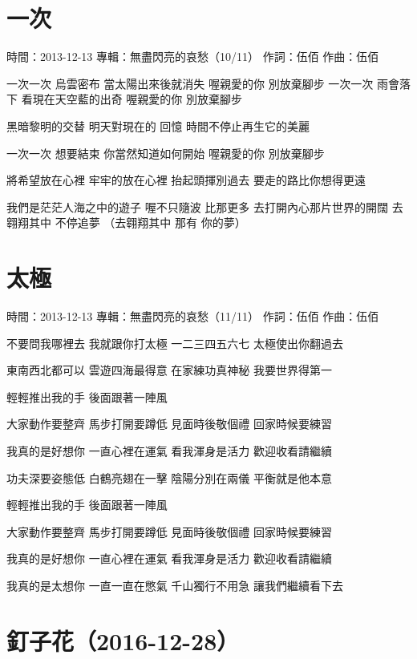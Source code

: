 \documentclass[UTF8,a4paper,oneside,twocolumn,12pt]{ctexbook}
\newcommand{\infopair}[2]{\textbullet #1：#2}
\newcommand{\zc}[1][伍佰]{\infopair{作詞}{#1}}
\newcommand{\zq}[1][伍佰]{\infopair{作曲}{#1}}
\newcommand{\zj}[1]{\infopair{專輯}{#1}}
\newcommand{\sj}[1]{\infopair{時間}{#1}}
\newenvironment{info}{\begin{flushleft}\kaishu
	}
	{\end{flushleft}\normalsize\yahei\par}
\newenvironment{lyric}{
	}
{}
\begin{document}
\section{一次}
\begin{info}
	\sj{2013-12-13}
	\zj{無盡閃亮的哀愁（10/11）}
	\zc
	\zq
\end{info}
\begin{lyric}
	一次一次 烏雲密布 當太陽出來後就消失
	喔親愛的你 別放棄腳步
	一次一次 雨會落下 看現在天空藍的出奇
	喔親愛的你 別放棄腳步

	黑暗黎明的交替 明天對現在的 回憶
	時間不停止再生它的美麗

	一次一次 想要結束 你當然知道如何開始
	喔親愛的你 別放棄腳步

	將希望放在心裡 牢牢的放在心裡
	抬起頭揮別過去 要走的路比你想得更遠

	我們是茫茫人海之中的遊子
	喔不只隨波 比那更多
	去打開內心那片世界的開闊
	去翱翔其中 不停追夢
	（去翱翔其中 那有 你的夢）
\end{lyric}

\section{太極}
\begin{info}
	\sj{2013-12-13}
	\zj{無盡閃亮的哀愁（11/11）}
	\zc
	\zq
\end{info}
\begin{lyric}
	不要問我哪裡去 我就跟你打太極
	一二三四五六七 太極使出你翻過去

	東南西北都可以 雲遊四海最得意
	在家練功真神秘 我要世界得第一

	輕輕推出我的手 後面跟著一陣風

	大家動作要整齊 馬步打開要蹲低
	見面時後敬個禮 回家時候要練習

	我真的是好想你 一直心裡在運氣
	看我渾身是活力 歡迎收看請繼續

	功夫深要姿態低 白鶴亮翅在一擊
	陰陽分別在兩儀 平衡就是他本意

	輕輕推出我的手 後面跟著一陣風

	大家動作要整齊 馬步打開要蹲低
	見面時後敬個禮 回家時候要練習

	我真的是好想你 一直心裡在運氣
	看我渾身是活力 歡迎收看請繼續

	我真的是太想你 一直一直在憋氣
	千山獨行不用急 讓我們繼續看下去
\end{lyric}

\section*{釘子花（2016-12-28）}
\end{document}
